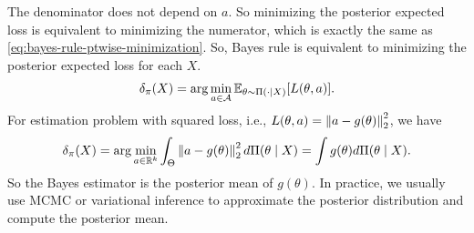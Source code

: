 \documentclass[11pt,letterpaper]{article}
\begin{document}
The denominator does not depend on $a$. So minimizing the posterior expected loss is equivalent to minimizing the numerator, which is exactly the same as \eqref{eq:bayes-rule-ptwise-minimization}. So, Bayes rule is equivalent to minimizing the posterior expected loss for each $X$.
\begin{align*}
  \delta_\pi(X) = \arg\min_{a \in \mathcal{A}} {\mathbb{E}}_{\theta \sim \Pi(\cdot \mid X)} [L(\theta, a)].
\end{align*}
For estimation problem with squared loss, i.e., $L(\theta, a) = \left\| a - g(\theta)\right\|_{2}^2$, we have
\begin{align*}
  \delta_\pi(X) = \arg\min_{a \in \mathbb{R}^k} \int_\Theta \left\| a - g (\theta)\right\|_{2}^2 d\Pi (\theta \mid X) = \int g (\theta) d \Pi (\theta \mid X).
\end{align*}
So the Bayes estimator is the posterior mean of $g(\theta)$. In practice, we usually use MCMC or variational inference to approximate the posterior distribution and compute the posterior mean.
\end{document}
